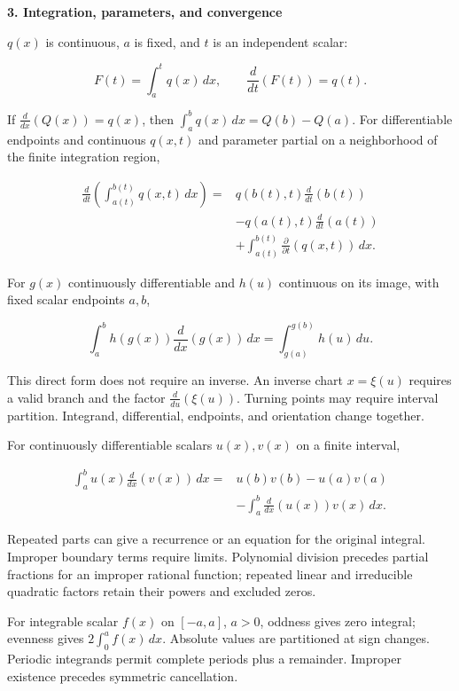 \documentclass[11pt,oneside,openany]{book}
\begin{document}
\newpage
{\sffamily\large\bfseries 3. Integration, parameters, and convergence\par}\vspace{5pt}
\begin{minipage}[t]{0.485\textwidth}\vspace{0pt}

\(q(x)\) is continuous, \(a\) is fixed, and \(t\) is an independent scalar:

\[
F(t)=\int_a^t q(x)\,dx,\qquad \frac{d}{dt}(F(t))=q(t).
\]

If \(\frac{d}{dx}(Q(x))=q(x)\), then \(\int_a^bq(x)\,dx=Q(b)-Q(a)\).
For differentiable endpoints and continuous \(q(x,t)\) and parameter partial
on a neighborhood of the finite integration region,

\[
\begin{aligned}
\frac{d}{dt}\left(\int_{a(t)}^{b(t)}q(x,t)\,dx\right)
={}&q(b(t),t)\frac{d}{dt}(b(t))\\
&-q(a(t),t)\frac{d}{dt}(a(t))\\
&+\int_{a(t)}^{b(t)}\frac{\partial}{\partial t}(q(x,t))\,dx.
\end{aligned}
\]


For \(g(x)\) continuously differentiable and \(h(u)\) continuous on its image,
with fixed scalar endpoints \(a,b\),

\[
\int_a^b h(g(x))\frac{d}{dx}(g(x))\,dx
=\int_{g(a)}^{g(b)}h(u)\,du.
\]

This direct form does not require an inverse. An inverse chart
\(x=\xi(u)\) requires a valid branch and the factor
\(\frac{d}{du}(\xi(u))\). Turning points may require interval partition.
Integrand, differential, endpoints, and orientation change together.


For continuously differentiable scalars \(u(x),v(x)\) on a finite interval,

\[
\begin{aligned}
\int_a^b u(x)\frac{d}{dx}(v(x))\,dx
={}&u(b)v(b)-u(a)v(a)\\
&-\int_a^b\frac{d}{dx}(u(x))v(x)\,dx.
\end{aligned}
\]

Repeated parts can give a recurrence or an equation for the original integral.
Improper boundary terms require limits. Polynomial division precedes partial
fractions for an improper rational function; repeated linear and irreducible
quadratic factors retain their powers and excluded zeros.

For integrable scalar \(f(x)\) on \([-a,a]\), \(a>0\), oddness gives zero integral;
evenness gives \(2\int_0^a f(x)\,dx\). Absolute values are partitioned at sign
changes. Periodic integrands permit complete periods plus a remainder.
Improper existence precedes symmetric cancellation.
\end{minipage}%
\end{document}
